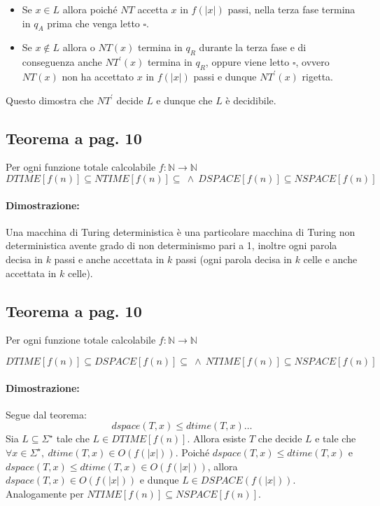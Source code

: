 \begin{itemize}
    \item {
        Se $x\in L$ allora poiché $NT$ accetta $x$ in $f(|x|)$ passi, nella terza fase termina in $q_{A}$ prima che venga
        letto $\square$.
    }
    \item {
        Se $x\notin L$ allora o $NT(x)$ termina in $q_{R}$ durante la terza fase e di conseguenza anche $NT^{'}(x)$ termina in $q_{R}$,
        oppure viene letto $\square$, ovvero $NT(x)$ non ha accettato $x$ in $f(|x|)$ passi e dunque $NT^{'}(x)$ rigetta.
    }
\end{itemize}
Questo dimostra che $NT^{'}$ decide $L$ e dunque che $L$ è decidibile.

\subsection{Teorema a pag. 10}

Per ogni funzione totale calcolabile $f: \mathbb{N} \rightarrow \mathbb{N}$ 
$$DTIME[f(n)] \subseteq NTIME[f(n)] \subseteq\ \land\ DSPACE[f(n)] \subseteq NSPACE[f(n)]$$ 

\paragraph*{Dimostrazione:} Una macchina di Turing deterministica è una particolare macchina di Turing non deterministica 
avente grado di non determinismo pari a 1, inoltre ogni parola decisa in $k$ passi e anche accettata in $k$ passi 
(ogni parola decisa in $k$ celle e anche accettata in $k$ celle).

\subsection{Teorema a pag. 10}

Per ogni funzione totale calcolabile $f: \mathbb{N} \rightarrow \mathbb{N}$ 

$$DTIME[f(n)] \subseteq DSPACE[f(n)] \subseteq\ \land\ NTIME[f(n)] \subseteq NSPACE[f(n)]$$ 

\paragraph*{Dimostrazione:} Segue dal teorema:
$$dspace(T, x) \leq dtime(T, x)\dots$$
Sia $L \subseteq \Sigma^{\star}$ tale che $L \in DTIME[f(n)]$. Allora esiste $T$ che decide $L$ e tale che 
$\forall x\in \Sigma^{\star},\ dtime(T, x) \in O(f(|x|))$. Poiché $dspace(T, x) \leq dtime(T, x)$ e $dspace(T, x) \leq dtime(T, x) \in O(f(|x|))$,
allora $dspace(T, x) \in O(f(|x|))$ e dunque $L \in DSPACE(f(|x|))$. Analogamente per $NTIME[f(n)] \subseteq NSPACE[f(n)]$.


